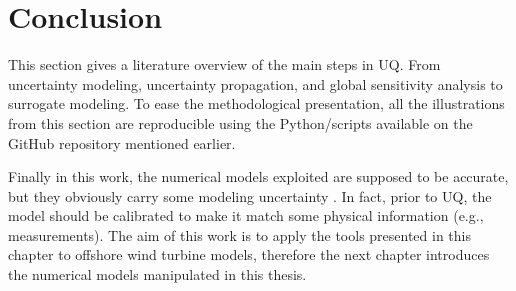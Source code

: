 \section{Conclusion}

This section gives a literature overview of the main steps in UQ. 
From uncertainty modeling, uncertainty propagation, and global sensitivity analysis to surrogate modeling. 
To ease the methodological presentation, all the illustrations from this section are reproducible using the Python/\ot scripts available on the GitHub repository mentioned earlier. 

Finally in this work, the numerical models exploited are supposed to be accurate, but they obviously carry some modeling uncertainty \citep{oberkampf_2010_VVUQ}. 
In fact, prior to UQ, the model should be calibrated to make it match some physical information (e.g., measurements). 
The aim of this work is to apply the tools presented in this chapter to offshore wind turbine models, therefore the next chapter introduces the numerical models manipulated in this thesis.  
